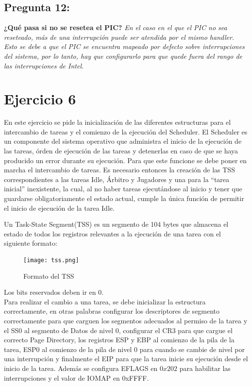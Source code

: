 \documentclass[10pt, a4paper]{article}
\begin{document}
{\subsection{Pregunta 12:}} \textbf{¿Qué pasa si no se resetea el PIC?}\newline
\newline
\textit{En el caso en el que el PIC no sea reseteado, más de una interrupción puede ser atendida por el mismo handler. Esto se debe a que el PIC se encuentra mapeado por defecto sobre interrupciones del sistema, por lo tanto, hay que configurarlo para que quede fuera del rango de las interrupciones de Intel.}

\section{Ejercicio 6}
En este ejercicio se pide la inicialización de las diferentes estructuras para el intercambio de tareas y el comienzo de la ejecución del Scheduler. El Scheduler es un componente del sistema operativo que administra el inicio de la ejecuci\'on de las tareas, \'orden de ejecuci\'on de las tareas y detenerlas en caso de que se haya producido un error durante su ejecuci\'on. Para que este funcione se debe poner en marcha el intercambio de tareas. Es necesario entonces la creaci\'on de las TSS correspondientes a las tareas Idle, \'Arbitro y Jugadores y una para la ``tarea inicial'' inexistente, la cual, al no haber tareas ejecut\'andose al inicio y tener que guardarse obligatoriamente el estado actual, cumple la \'unica funci\'on de permitir el inicio de ejecuci\'on de la tarea Idle.\newline

Un Task-State Segment(TSS) es un segmento de 104 bytes que almacena el estado de todos los registros relevantes a la ejecuci\'on de una tarea con el siguiente formato:
\begin{figure}[h]
	\centering
	\texttt{[image: tss.png]}
	\caption{Formato del TSS}
\end{figure}

Los bits reservados deben ir en 0.\\
Para realizar el cambio a una tarea, se debe inicializar la estructura correctamente, en otras palabras configurar los descriptores de segmento correctamente para que carguen los segmentos adecuados al permiso de la tarea y el SS0 al segmento de Datos de nivel 0, configurar el CR3 para que cargue el correcto Page Directory, los registros ESP y EBP al comienzo de la pila de la tarea, ESP0 al comienzo de la pila de nivel 0 para cuando se cambie de nivel por una interrupci\'on y finalmente el EIP para que la tarea inicie su ejecuci\'on desde el inicio de la tarea. Además se configura EFLAGS en $0x202$ para habilitar las interrupciones y el valor de IOMAP en 0xFFFF.\newline
\end{document}
